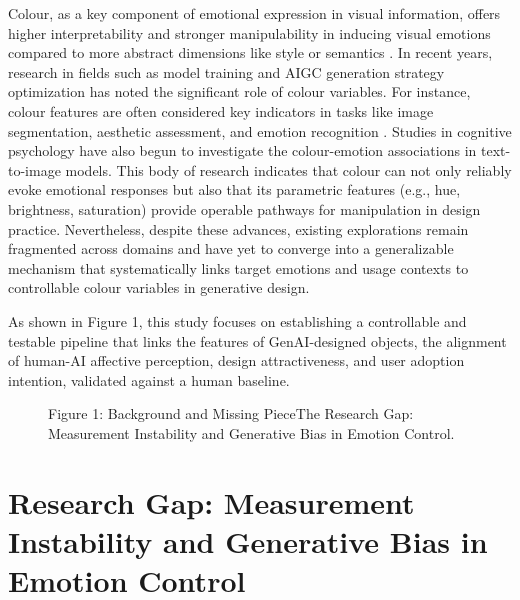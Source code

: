 Colour, as a key component of emotional expression in visual information, offers higher interpretability and stronger manipulability in inducing visual emotions compared to more abstract dimensions like style or semantics \cite{kobayashiAimMethodColor1981,ouCrossculturalComparisonColour2012,valdezEffectsColorEmotions1994}. In recent years, research in fields such as model training and AIGC generation strategy optimization has noted the significant role of colour variables. For instance, colour features are often considered key indicators in tasks like image segmentation, aesthetic assessment, and emotion recognition \cite{nieDeepLearningbasedMachine2023,yuArtificialIntelligenceAIdriven2025}. Studies in cognitive psychology have also begun to investigate the colour-emotion associations in text-to-image models. This body of research indicates that colour can not only reliably evoke emotional responses but also that its parametric features (e.g., hue, brightness, saturation) provide operable pathways for manipulation in design practice. Nevertheless, despite these advances, existing explorations remain fragmented across domains and have yet to converge into a generalizable mechanism that systematically links target emotions and usage contexts to controllable colour variables in generative design.

As shown in Figure 1, this study focuses on establishing a controllable and testable pipeline that links the features of GenAI-designed objects, the alignment of human-AI affective perception, design attractiveness, and user adoption intention, validated against a human baseline.

\begin{figure}[htbp]

  \centering



  \caption{Figure 1: Background and Missing PieceThe Research Gap: Measurement Instability and Generative Bias in Emotion Control.}

  \label{fig:figure_1_background_and_missing_piecethe}

\end{figure}

\section{Research Gap: Measurement Instability and Generative Bias in Emotion Control}

